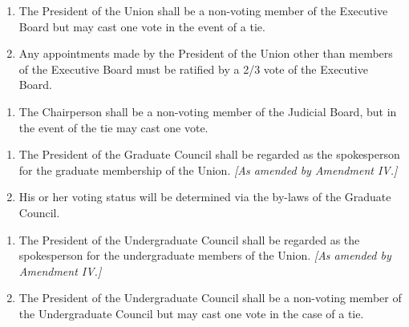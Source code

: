 

\begin{enumerate}
\item The President of the Union shall be a non-voting member of the Executive Board but may cast one vote in the event of a tie.
\item Any appointments made by the President of the Union other than members of the Executive Board must be ratified by a 2/3 vote of the Executive Board.
\end{enumerate}



\begin{enumerate}
\item The Chairperson shall be a non-voting member of the Judicial Board, but in the event of the tie may cast one vote.
\end{enumerate}



\begin{enumerate}
\item The President of the Graduate Council shall be regarded as the spokesperson for the graduate membership of the Union. \textit{[As amended by Amendment IV.]}
\item His or her voting status will be determined via the by-laws of the Graduate Council.
\end{enumerate}



\begin{enumerate}
\item The President of the Undergraduate Council shall be regarded as the spokesperson for the undergraduate members of the Union. \textit{[As amended by Amendment IV.]}
\item The President of the Undergraduate Council shall be a non-voting member of the Undergraduate Council but may cast one vote in the case of a tie.
\end{enumerate}

